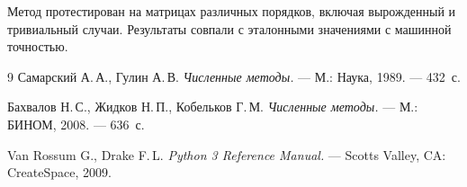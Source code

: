 \documentclass[12pt,a4paper]{scrartcl}
\begin{document}
Метод протестирован на матрицах различных порядков, включая вырожденный и
тривиальный случаи. Результаты совпали с эталонными значениями с машинной точностью.

\begin{thebibliography}{9}
        Самарский А.\,А., Гулин А.\,В.
        \textit{Численные методы.} ---
        М.: Наука, 1989. --- 432~с.

        Бахвалов Н.\,С., Жидков Н.\,П., Кобельков Г.\,М.
        \textit{Численные методы.} ---
        М.: БИНОМ, 2008. --- 636~с.

        Van Rossum G., Drake F.\,L.
        \textit{Python 3 Reference Manual.} ---
        Scotts Valley, CA: CreateSpace, 2009.
\end{thebibliography}
\end{document}
